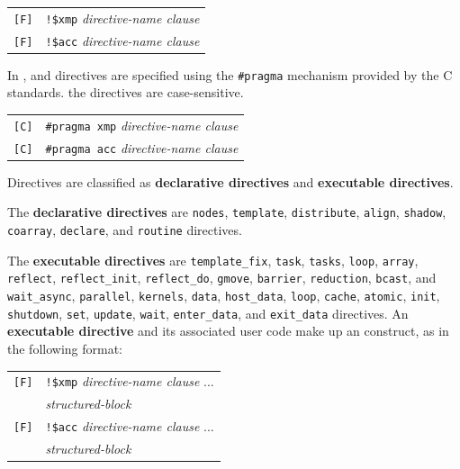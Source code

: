 \vspace{0.5cm}
\begin{tabular}{ll}
\verb![F]! & \verb|!$xmp| {\it directive-name clause} \\
\verb![F]! & \verb|!$acc| {\it directive-name clause} \\
\end{tabular}
\vspace{0.5cm}

In {\XACC}, 
{\XMP} and {\OACC} directives are specified using the \verb|#pragma| mechanism provided by the C standards.
the directives are case-sensitive.

\vspace{0.5cm}
\begin{tabular}{ll}
\verb![C]! & \verb|#pragma xmp| {\it directive-name clause} \\
\verb![C]! & \verb|#pragma acc| {\it directive-name clause} \\
\end{tabular}
\vspace{0.5cm}

Directives are classified as {\bf declarative directives} and {\bf executable directives}\cite{xmp}.

The {\bf declarative directives} are {\tt nodes}, {\tt template}, {\tt distribute}, {\tt align},
{\tt shadow}, {\tt coarray}, {\tt declare}, and {\tt routine} directives.

The {\bf executable directives} are {\tt template\_fix}, {\tt task}, {\tt tasks}, {\XMP} {\tt loop}, 
{\tt array}, {\tt reflect}, {\tt reflect\_init}, {\tt reflect\_do}, {\tt gmove}, {\tt barrier}, 
{\tt reduction}, {\tt bcast}, and {\tt wait\_async},
{\tt parallel}, {\tt kernels}, {\tt data}, {\tt host\_data}, {\OACC} {\tt loop},
{\tt cache}, {\tt atomic}, {\tt init}, {\tt shutdown}, {\tt set}, {\tt update}, 
{\tt wait}, {\tt enter\_data}, and {\tt exit\_data} directives.
An {\bf executable directive} and its associated user code make up an {\XACC} construct, 
as in the following format:

\vspace{0.5cm}
\begin{tabular}{ll}
\verb![F]! & \verb|!$xmp| {\it directive-name clause} ...\\
 & \hspace{0.5cm} {\it structured-block} \\
\verb![F]! & \verb|!$acc| {\it directive-name clause} ...\\
 & \hspace{0.5cm} {\it structured-block} \\
\end{tabular}

